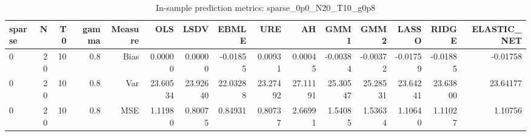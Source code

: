 \begin{table}[!htbp]\centering
\caption{In-sample prediction metrics: sparse_0p0_N20_T10_g0p8}
\label{tab:table2_sparse_0p0_N20_T10_g0p8}
\begin{tabular}{lrrrrrrrrrrrrrr}
\hline
sparse & N & T0 & gamma & Measure & OLS & LSDV & EBMLE & URE & AH & GMM1 & GMM2 & LASSO & RIDGE & ELASTIC_NET \\
\hline
0 & 20 & 10 & 0.8 & Bias & 0.00000 & 0.00000 & -0.01855 & 0.00931 & 0.00045 & -0.00384 & -0.00372 & -0.01759 & -0.01885 & -0.01758 \\
0 & 20 & 10 & 0.8 & Var & 23.60534 & 23.92640 & 22.03288 & 23.27492 & 27.11191 & 25.30547 & 25.28531 & 23.64241 & 23.63800 & 23.64177 \\
0 & 20 & 10 & 0.8 & MSE & 1.11980 & 0.80075 & 0.84931 & 0.80737 & 2.66991 & 1.54085 & 1.53634 & 1.10640 & 1.11027 & 1.10756 \\
\hline
\end{tabular}
\end{table}

